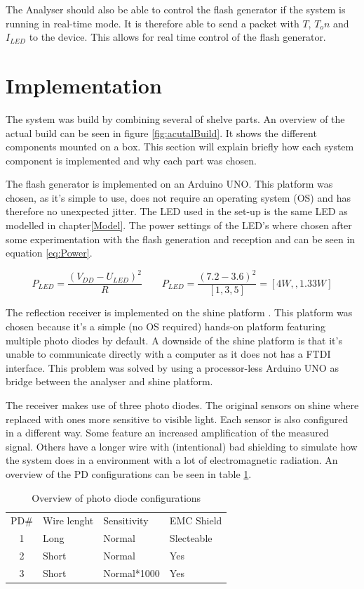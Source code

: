 The Analyser should also be able to control the flash generator if the system is running in real-time mode. It is therefore able to send a packet with $T$, ${T_on}$ and $I_{LED}$ to the device. This allows for real time control of the flash generator.

\section{Implementation}
The system was build by combining several of shelve parts. An overview of the actual build can be seen in figure \ref{fig:acutalBuild}. It shows the different components mounted on a box. This section will explain briefly how each system component is implemented and why each part was chosen.

The flash generator is implemented on an Arduino UNO\cite{ArduinoUno}. This platform was chosen, as it's simple to use, does not require an operating system (OS) and has therefore no unexpected jitter. The LED used in the set-up is the same LED as modelled in chapter\ref{Model}\cite{lamptest}. The power settings of the LED's where chosen after some experimentation with the flash generation and reception and can be seen in equation \ref{eq:Power}.

\begin{equation}
\label{eq:Power}
P_{LED}=\frac{(V_{DD} - U_{LED})^2}{R}
\qquad
P_{LED} = \frac{(7.2 - 3.6)^2}{[1, 3, 5]} = [4W, ,1.33W]
\end{equation}

The reflection receiver is implemented on the shine platform \cite{Shine}. This platform was chosen because it's a simple (no OS required) hands-on platform featuring multiple photo diodes by default. A downside of the shine platform is that it's unable to communicate directly with a computer as it does not has a FTDI interface. This problem was solved by using a processor-less Arduino UNO as bridge between the analyser and shine platform.

The receiver makes use of three photo diodes. The original sensors on shine where replaced with ones more sensitive to visible light. Each sensor is also configured in a different way. Some feature an increased amplification of the measured signal. Others have a longer wire with (intentional) bad shielding to simulate how the system does in a environment with a lot of electromagnetic radiation. An overview of the PD configurations can be seen in table \ref{tbl:PDs}.

\begin{table}[]
	\centering
	\label{tbl:PDs}
	\begin{tabular}{clll}
		PD\#                   & Wire lenght & Sensitivity & EMC Shield \\ \cline{2-4} 
		\multicolumn{1}{c|}{1} & Long        & Normal      & Slecteable \\
		\multicolumn{1}{c|}{2} & Short       & Normal      & Yes        \\
		\multicolumn{1}{c|}{3} & Short       & Normal*1000 & Yes       
	\end{tabular}
	\caption{Overview of photo diode configurations}
\end{table}

